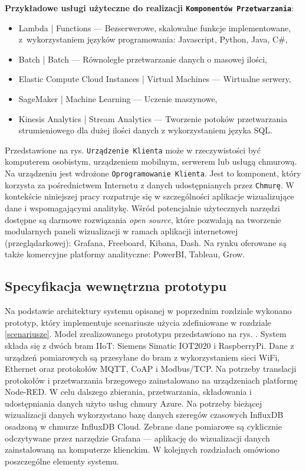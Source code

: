 \documentclass[a4paper, 12pt, twoside]{article}
\begin{document}
\noindent\textbf{Przykładowe usługi użyteczne do realizacji \texttt{Komponentów Przetwarzania}}:
\begin{itemize}
      \itemsep0em
      \item Lambda | Functions --- Bezserwerowe, skalowalne funkcje implementowane,
            z~wykorzystaniem języków programowania: Javascript, Python, Java, C\#,
      \item Batch | Batch --- Równoległe przetwarzanie danych o masowej ilości,
      \item Elastic Compute Cloud Instances | Virtual Machines --- Wirtualne
            serwery,
      \item SageMaker | Machine Learning --- Uczenie maszynowe,
      \item Kinesis Analytics | Stream Analytics --- Tworzenie potoków przetwarzania
            strumieniowego dla dużej ilości danych z wykorzystaniem języka SQL.
\end{itemize}

Przedstawione na rys.  \texttt{Urządzenie Klienta} może w rzeczywistości
być komputerem osobistym, urządzeniem mobilnym, serwerem lub usługą chmurową.
Na urządzeniu jest wdrożone \texttt{Oprogramowanie Klienta}. Jest to komponent, który
korzysta za pośrednictwem Internetu z danych udostępnianych przez \texttt{Chmurę}.
W kontekście niniejszej pracy rozpatruje się w szczególności
aplikacje wizualizujące dane i wspomagającymi analitykę. Wśród potencjalnie
użytecznych narzędzi dostępne są darmowe rozwiązania \emph{open source}, które
pozwalają na tworzenie modularnych paneli wizualizacji w ramach
aplikacji internetowej (przeglądarkowej): Grafana,
Freeboard, Kibana, Dash. Na rynku oferowane są także komercyjne platformy analityczne:
PowerBI, Tableau, Grow.

\subsection{Specyfikacja wewnętrzna prototypu}

Na podstawie architektury systemu opisanej w poprzednim rozdziale wykonano
prototyp, który implementuje scenariusze użycia zdefiniowane w rozdziale \ref{scenariusze}.
Model zrealizowanego prototypu przedstawiono na rys. .
System składa się z dwóch bram IIoT: Siemens Simatic IOT2020 i RaspberryPi.
Dane z urządzeń pomiarowych są przesyłane do bram z wykorzystaniem sieci WiFi, Ethernet
oraz protokołów MQTT, CoAP i Modbus/TCP. Na potrzeby translacji protokołów
i przetwarzania brzegowego zainstalowano na urządzeniach platformę Node-RED.
W celu dalszego zbierania, przetwarzania, składowania i udostępniania danych
użyto usług chmury Azure. Na potrzeby bieżącej wizualizacji danych wykorzystano
bazę danych szeregów czasowych InfluxDB osadzoną w chmurze InfluxDB Cloud.
Zebrane dane pomiarowe są cyklicznie odczytywane przez narzędzie Grafana ---
aplikację do wizualizacji danych zainstalowaną na komputerze klienckim.
W kolejnych rozdziałach omówiono poszczególne elementy systemu.
\end{document}
